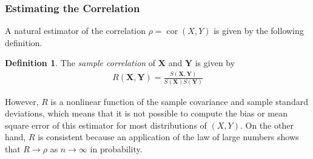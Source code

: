 \documentclass[a4paper,12pt]{article}
\theoremstyle{definition}
\theoremstyle{definition}
\theoremstyle{definition}
\newtheorem{definition}{Definition}[section]
\newcommand{\bs}{\boldsymbol}
\newcommand{\cor}{\operatorname{cor}}
\begin{document}
    \subsubsection*{Estimating the Correlation}
    A natural estimator of the correlation $\rho = \cor(X, Y)$ is given by the following definition.
    \begin{definition}
        The \textit{sample correlation} of $\bs{X}$ and $\bs{Y}$ is given by
        \begin{align*}
            R(\bs{X}, \bs{Y}) = \frac{S(\bs{X}, \bs{Y})}{S(\bs{X}) S(\bs{Y})}
        \end{align*}
    \end{definition}
    However, $R$ is a nonlinear function of the sample covariance and sample standard deviations, which means that it is not possible to compute the bias or mean square error of this estimator for most distributions of $(X, Y)$. On the other hand, $R$ is consistent because an application of the law of large numbers shows that $R \to \rho$ as $n \to \infty$ in probability.
\end{document}

